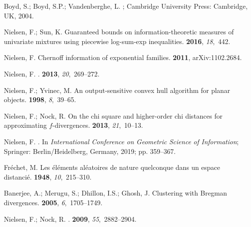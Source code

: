 \documentclass[entropy,article,accept,oneauthor,pdftex,entropy]{Definitions/mdpi}
\begin{document}
\begin{thebibliography}{999}
Boyd, S.; Boyd, S.P.; Vandenberghe, L.
; Cambridge University Press: {Cambridge, UK},  2004.

Nielsen, F.; Sun, K.
\newblock Guaranteed bounds on information-theoretic measures of univariate
  mixtures using piecewise log-sum-exp inequalities.
 {\bf 2016}, {\em 18},~442.

Nielsen, F.
\newblock Chernoff information of exponential families.
 {\bf 2011}, arXiv:1102.2684.

Nielsen, F.
.
 {\bf 2013}, {\em 20},~269--272.

Nielsen, F.; Yvinec, M.
\newblock An output-sensitive convex hull algorithm for planar objects.
  {\bf 1998}, {\em 8},~39--65.

Nielsen, F.; Nock, R.
\newblock On the chi square and higher-order chi distances for approximating
  $f$-divergences.
 {\bf 2013}, {\em 21},~10--13.

Nielsen, F.
.
\newblock In \emph{International Conference on Geometric Science of Information};
  Springer:  {Berlin/Heidelberg, Germany,} 
  2019; pp. 359--367.

Fr{\'e}chet, M.
\newblock Les {\'e}l{\'e}ments al{\'e}atoires de nature quelconque dans un
  espace distanci{\'e}.
 {\bf 1948}, {\em
  10},~215--310.

Banerjee, A.; Merugu, S.; Dhillon, I.S.; Ghosh, J.
\newblock Clustering with {B}regman divergences.
 {\bf 2005}, {\em
  6},~1705--1749.

Nielsen, F.; Nock, R.
.
 {\bf 2009}, {\em
  55},~2882--2904.


\end{thebibliography}
\end{document}
